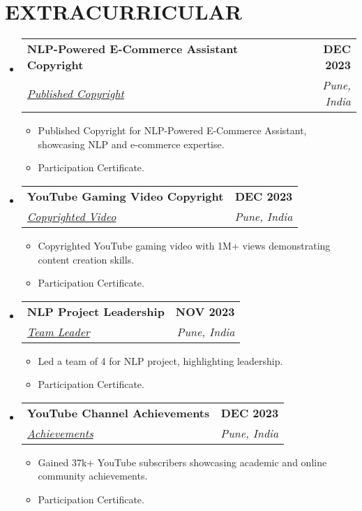 \documentclass[letterpaper,11pt]{article}
\makeatletter
\newcommand{\resumeItem}[1]{
  \item\small{
    {#1 \vspace{-2pt}}
  }
}
\newcommand{\resumeSubheading}[4]{
  \vspace{-2pt}\item
    \begin{tabular*}{1.0\textwidth}[t]{l@{\extracolsep{\fill}}r}
      \textbf{\large#1} & \textbf{\small #2} \\
      \textit{\large#3} & \textit{\small #4} \\
      
    \end{tabular*}\vspace{-7pt}
}
\newcommand{\resumeSubHeadingListStart}{\begin{itemize}[leftmargin=0.0in, label={}]}
\newcommand{\resumeSubHeadingListEnd}{\end{itemize}}
\newcommand{\resumeItemListStart}{\begin{itemize}}
\newcommand{\resumeItemListEnd}{\end{itemize}\vspace{-5pt}}
\makeatother
\begin{document}
\section{EXTRACURRICULAR}
    \resumeSubHeadingListStart
        \resumeSubheading{NLP-Powered E-Commerce Assistant Copyright}{ DEC 2023}{\underline{Published Copyright}}{Pune, India}
            \resumeItemListStart
                \resumeItem{\normalsize{Published Copyright for NLP-Powered E-Commerce Assistant, showcasing NLP and e-commerce expertise.}}
                \resumeItem{\normalsize{Participation Certificate.}}
            \resumeItemListEnd
        
        \resumeSubheading{YouTube Gaming Video Copyright}{ DEC 2023}{\underline{Copyrighted Video}}{Pune, India}
            \resumeItemListStart
                \resumeItem{\normalsize{Copyrighted YouTube gaming video with 1M+ views demonstrating content creation skills.}}
                \resumeItem{\normalsize{Participation Certificate.}}
            \resumeItemListEnd
        
        \resumeSubheading{NLP Project Leadership}{ NOV 2023}{\underline{Team Leader}}{Pune, India}
            \resumeItemListStart
                \resumeItem{\normalsize{Led a team of 4 for NLP project, highlighting leadership.}}
                \resumeItem{\normalsize{Participation Certificate.}}
            \resumeItemListEnd
        
        \resumeSubheading{YouTube Channel Achievements}{DEC 2023}{\underline{Achievements}}{Pune, India}
            \resumeItemListStart
                \resumeItem{\normalsize{Gained 37k+ YouTube subscribers showcasing academic and online community achievements.}}
                \resumeItem{\normalsize{Participation Certificate.}}
            \resumeItemListEnd
    \resumeSubHeadingListEnd
\vspace{-11pt}


 
\end{document}
